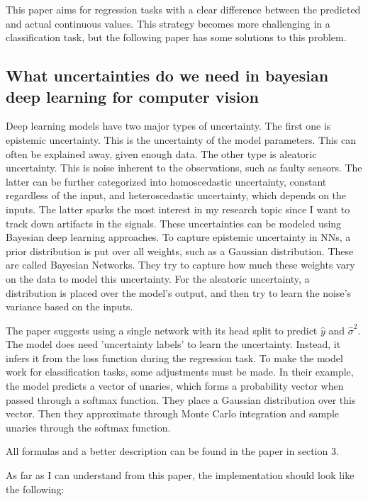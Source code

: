 \documentclass[10pt]{article}
\begin{document}
This paper aims for regression tasks with a clear difference between the predicted and actual continuous values. This strategy becomes more challenging in a classification task, but the following paper has some solutions to this problem.

\subsection*{What uncertainties do we need in bayesian deep learning for computer vision \cite{kendall2017uncertainties}}

Deep learning models have two major types of uncertainty. The first one is epistemic uncertainty. This is the uncertainty of the model parameters. This can often be explained away, given enough data. The other type is aleatoric uncertainty. This is noise inherent to the observations, such as faulty sensors. The latter can be further categorized into homoscedastic uncertainty, constant regardless of the input, and heteroscedastic uncertainty, which depends on the inputs. The latter sparks the most interest in my research topic since I want to track down artifacts in the signals. These uncertainties can be modeled using Bayesian deep learning approaches. To capture epistemic uncertainty in NNs, a prior distribution is put over all weights, such as a Gaussian distribution. These are called Bayesian Networks. They try to capture how much these weights vary on the data to model this uncertainty. For the aleatoric uncertainty, a distribution is placed over the model's output, and then try to learn the noise's variance based on the inputs.


The paper suggests using a single network with its head split to predict $\hat{y}$ and $\hat{\sigma}^2$. The model does need 'uncertainty labels' to learn the uncertainty. Instead, it infers it from the loss function during the regression task. To make the model work for classification tasks, some adjustments must be made. In their example, the model predicts a vector of unaries, which forms a probability vector when passed through a softmax function. They place a Gaussian distribution over this vector.
Then they approximate through Monte Carlo integration and sample unaries through the softmax function.

All formulas and a better description can be found in the paper in section 3.

As far as I can understand from this paper, the implementation should look like the following:
\end{document}
